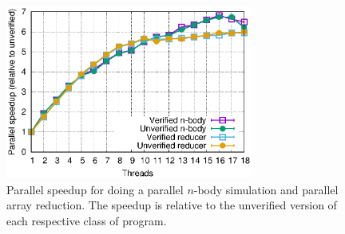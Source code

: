 \begin{figure}
  \begin{center}
    \includegraphics[width=3.2in]{text/refinementreflection/nbody.eps}
  \end{center}
  \caption{Parallel speedup for doing a parallel $n$-body simulation and
      parallel array reduction. The speedup is relative to the
    unverified version of each respective class of program.}
  \label{fig:nbody}
\end{figure}

